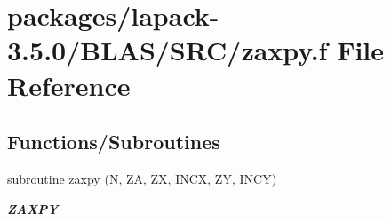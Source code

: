 \hypertarget{lapack-3_85_80_2BLAS_2SRC_2zaxpy_8f}{}\section{packages/lapack-\/3.5.0/\+B\+L\+A\+S/\+S\+R\+C/zaxpy.f File Reference}
\label{lapack-3_85_80_2BLAS_2SRC_2zaxpy_8f}
\subsection*{Functions/\+Subroutines}
\begin{DoxyCompactItemize}
\item 
subroutine \hyperlink{group__complex16__blas__level1_ga51cb4e3c658f121bdfb5f29a6c0a0bfb}{zaxpy} (\hyperlink{polmisc_8c_a0240ac851181b84ac374872dc5434ee4}{N}, Z\+A, Z\+X, I\+N\+C\+X, Z\+Y, I\+N\+C\+Y)
\begin{DoxyCompactList}\small\item\em {\bfseries Z\+A\+X\+P\+Y} \end{DoxyCompactList}\end{DoxyCompactItemize}
